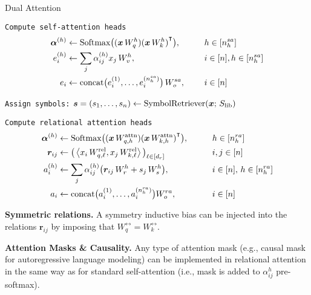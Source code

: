 \begin{algorithm}[ht!]
	\caption{Dual Attention}\label{alg:dual_head_attn}

    \vspace{1em}

    \texttt{Compute self-attention heads}
    \begin{align*}
        \bm{\alpha}^{(h)} &\gets \mathrm{Softmax}\big({(\bm{x} \, W_q^h)} {(\bm{x} \, W_k^h)}^\intercal\big), \qquad && h \in [n_h^{sa}] \\
        e_i^{(h)} &\gets \sum_{j} \alpha_{ij}^{(h)} x_j \, W_v^h, \qquad && i \in [n], h \in [n_h^{sa}]\\
        e_i &\gets \mathrm{concat}\big(e_i^{(1)}, \ldots, e_i^{(n_h^{sa})}\big) \, W_o^{sa}, && i \in [n]
    \end{align*}

    \texttt{Assign symbols:} $\bm{s} = (s_1, \ldots, s_n) \gets \mathrm{SymbolRetriever}(\bm{x};\,S_\mathrm{lib})$

    \texttt{Compute relational attention heads}
    \begin{align*}
        \bm{\alpha}^{(h)} &\gets \mathrm{Softmax}\big({(\bm{x} \, W_{q, h}^{\mathrm{attn}})} {(\bm{x} \, W_{k, h}^{\mathrm{attn}})}^\intercal\big), \qquad && h \in [n_h^{ra}] \\
        \bm{r}_{ij} &\gets \big(\left \langle x_i \, W_{q, \ell}^{\mathrm{rel}}, x_j \, W_{k, \ell}^{\mathrm{rel}} \right\rangle\big)_{\ell \in [d_r]} \qquad && i,j \in [n] \\
        a_i^{(h)} &\gets \sum_{j} \alpha_{ij}^{(h)} \big(\bm{r}_{ij}\,W_r^h + s_j \, W_s^{h}\big), \qquad && i \in [n],\, h \in [n_h^{ra}]\\
        a_i &\gets \mathrm{concat}\big(a_i^{(1)}, \ldots, a_i^{(n_h^{ra})}\big) W_o^{ra}, && i \in [n]
    \end{align*}


\end{algorithm}

\textbf{Symmetric relations.} A symmetry inductive bias can be injected into the relations $\bm{r}_{ij}$ by imposing that $W_{q}^{\rel} = W_k^{\rel}$.

\textbf{Attention Masks \& Causality.} Any type of attention mask (e.g., causal mask for autoregressive language modeling) can be implemented in relational attention in the same way as for standard self-attention (i.e., mask is added to $\alpha_{ij}^h$ pre-softmax).

